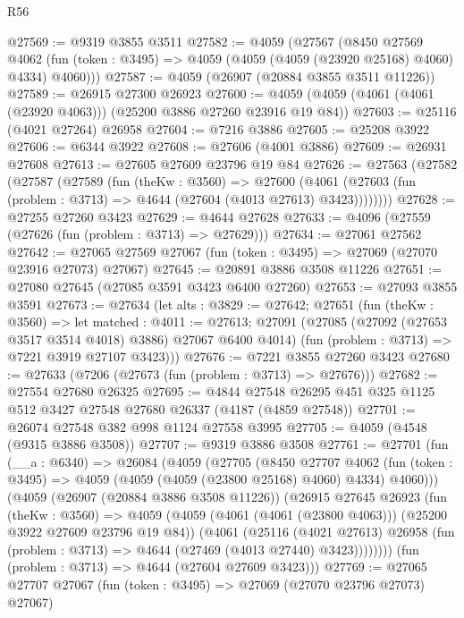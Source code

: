 \begin{lexlean}{R56}
\begin{coremodule}
@27569 := @9319 @3855 @3511
@27582 := @4059
    (@27567
      (@8450
        @27569
        @4062
        (fun (token : @3495) => @4059 (@4059 (@4059 (@23920 @25168) @4060) @4334) @4060)))
@27587 := @4059 (@26907 (@20884 @3855 @3511 @11226))
@27589 := @26915 @27300 @26923
@27600 := @4059 (@4059 (@4061 (@4061 (@23920 @4063))) (@25200 @3886 @27260 @23916 @19 @84))
@27603 := @25116 (@4021 @27264) @26958
@27604 := @7216 @3886
@27605 := @25208 @3922
@27606 := @6344 @3922
@27608 := @27606 (@4001 @3886)
@27609 := @26931 @27608
@27613 := @27605 @27609 @23796 @19 @84
@27626 := @27563
    (@27582
      (@27587
        (@27589
          (fun (theKw : @3560) =>
          @27600 (@4061 (@27603 (fun (problem : @3713) => @4644 (@27604 (@4013 @27613) @3423))))))))
@27628 := @27255 @27260 @3423
@27629 := @4644 @27628
@27633 := @4096 (@27559 (@27626 (fun (problem : @3713) => @27629)))
@27634 := @27061 @27562
@27642 := @27065 @27569 @27067 (fun (token : @3495) => @27069 (@27070 @23916 @27073) @27067)
@27645 := @20891 @3886 @3508 @11226
@27651 := @27080 @27645 (@27085 @3591 @3423 @6400 @27260)
@27653 := @27093 @3855 @3591
@27673 := @27634
    (let alts : @3829 := @27642;
    @27651
      (fun (theKw : @3560) =>
      let matched : @4011 := @27613;
      @27091
        (@27085 (@27092 (@27653 @3517 @3514 @4018) @3886) @27067 @6400 @4014)
        (fun (problem : @3713) => @7221 @3919 @27107 @3423)))
@27676 := @7221 @3855 @27260 @3423
@27680 := @27633 (@7206 (@27673 (fun (problem : @3713) => @27676)))
@27682 := @27554 @27680 @26325
@27695 := @4844 @27548 @26295 @451 @325 @1125 @512 @3427 @27548 @27680 @26337 (@4187 (@4859 @27548))
@27701 := @26074 @27548 @382 @998 @1124 @27558 @3995
@27705 := @4059 (@4548 (@9315 @3886 @3508))
@27707 := @9319 @3886 @3508
@27761 := @27701
    (fun (__a : @6340) =>
    @26084
      (@4059
        (@27705
          (@8450
            @27707
            @4062
            (fun (token : @3495) => @4059 (@4059 (@4059 (@23800 @25168) @4060) @4334) @4060)))
        (@4059
          (@26907 (@20884 @3886 @3508 @11226))
          (@26915
            @27645
            @26923
            (fun (theKw : @3560) =>
            @4059
              (@4059 (@4061 (@4061 (@23800 @4063))) (@25200 @3922 @27609 @23796 @19 @84))
              (@4061
                (@25116
                  (@4021 @27613)
                  @26958
                  (fun (problem : @3713) => @4644 (@27469 (@4013 @27440) @3423))))))))
      (fun (problem : @3713) => @4644 (@27604 @27609 @3423)))
@27769 := @27065 @27707 @27067 (fun (token : @3495) => @27069 (@27070 @23796 @27073) @27067)

\end{coremodule}
\end{lexlean}
